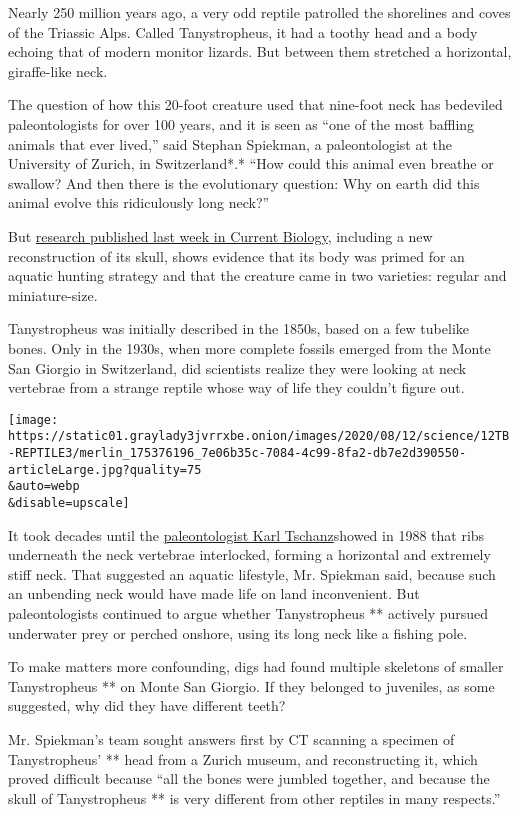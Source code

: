 Nearly 250 million years ago, a very odd reptile patrolled the
shorelines and coves of the Triassic Alps. Called Tanystropheus, it had
a toothy head and a body echoing that of modern monitor lizards. But
between them stretched a horizontal, giraffe-like neck.

The question of how this 20-foot creature used that nine-foot neck has
bedeviled paleontologists for over 100 years, and it is seen as ``one of
the most baffling animals that ever lived,'' said Stephan Spiekman, a
paleontologist at the University of Zurich, in Switzerland*.* ``How
could this animal even breathe or swallow? And then there is the
evolutionary question: Why on earth did this animal evolve this
ridiculously long neck?''

But
\href{https://www.cell.com/current-biology/pdfExtended/S0960-9822(20)31017-4}{research
published last week in Current Biology}, including a new reconstruction
of its skull, shows evidence that its body was primed for an aquatic
hunting strategy and that the creature came in two varieties: regular
and miniature-size.

Tanystropheus was initially described in the 1850s, based on a few
tubelike bones. Only in the 1930s, when more complete fossils emerged
from the Monte San Giorgio in Switzerland, did scientists realize they
were looking at neck vertebrae from a strange reptile whose way of life
they couldn't figure out.

\texttt{[image: https://static01.graylady3jvrrxbe.onion/images/2020/08/12/science/12TB-REPTILE3/merlin\_175376196\_7e06b35c-7084-4c99-8fa2-db7e2d390550-articleLarge.jpg?quality=75\\\&auto=webp\\\&disable=upscale]}

It took decades until the
\href{https://www.palass.org/publications/palaeontology-journal/archive/31/4/article_pp997-1011}{paleontologist
Karl Tschanz}showed in 1988 that ribs underneath the neck vertebrae
interlocked, forming a horizontal and extremely stiff neck. That
suggested an aquatic lifestyle, Mr. Spiekman said, because such an
unbending neck would have made life on land inconvenient. But
paleontologists continued to argue whether Tanystropheus ** actively
pursued underwater prey or perched onshore, using its long neck like a
fishing pole.

To make matters more confounding, digs had found multiple skeletons of
smaller Tanystropheus ** on Monte San Giorgio. If they belonged to
juveniles, as some suggested, why did they have different teeth?

Mr. Spiekman's team sought answers first by CT scanning a specimen of
Tanystropheus' ** head from a Zurich museum, and reconstructing it,
which proved difficult because ``all the bones were jumbled together,
and because the skull of Tanystropheus ** is very different from other
reptiles in many respects.''

